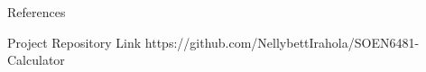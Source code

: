 \documentclass[final]{beamer}
\newlength{\onecolwid}
\begin{document}
\begin{frame}[t]
\begin{columns}[t]
\begin{column}{\onecolwid}
\begin{block}{References}
\end{block}


\begin{alertblock}{Project Repository Link}
https://github.com/NellybettIrahola/SOEN6481-Calculator
\end{alertblock}


\end{column} %

\end{columns} %

\end{frame} %
\end{document}
